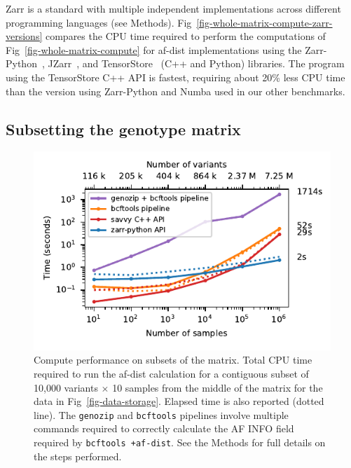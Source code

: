 \documentclass[a4paper,num-refs]{oup-contemporary}
\begin{document}
Zarr is a standard with multiple 
independent implementations across different programming languages
(see Methods). Fig~\ref{fig-whole-matrix-compute-zarr-versions}
compares the CPU time required to perform the computations
of Fig~\ref{fig-whole-matrix-compute}
for af-dist implementations using the Zarr-Python~\cite{zarrpython},
JZarr~\cite{jzarr},
and TensorStore~\citep{tensorstore} (C++ and Python) libraries.
The program using the TensorStore C++ API is fastest, requiring
about 20\% less CPU time than the version using Zarr-Python and Numba
used in our other benchmarks.


\subsection{Subsetting the genotype matrix}
\begin{figure}[t]
\includegraphics{figures/subset-matrix-compute}
\caption{Compute performance on subsets of the matrix.
Total CPU time required to run the af-dist calculation for
a contiguous subset of 10,000 variants $\times$ 10 samples
from the middle of the matrix
for the data in Fig~\ref{fig-data-storage}.
Elapsed time is also reported (dotted line).
The \texttt{genozip} and \texttt{bcftools} pipelines involve
multiple commands required to correctly calculate the AF INFO field
required by \texttt{bcftools +af-dist}. See the Methods for full details
on the steps performed.
\label{fig-subset-matrix-compute}}
\end{figure}
\end{document}
